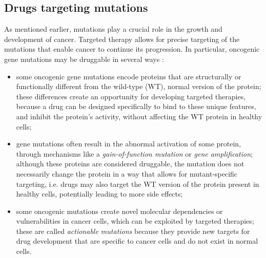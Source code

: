 %
%

\subsection{Drugs targeting mutations}

As mentioned earlier, mutations play a crucial role in the growth and development of cancer. Targeted therapy allows for precise targeting of the mutations that enable cancer to continue its progression. In particular, oncogenic gene mutations may be druggable in several ways \cite{jci}:

\begin{itemize}
    \item some oncogenic gene mutations encode proteins that are structurally or functionally different from the wild-type (WT), normal version of the protein; these differences create an opportunity for developing targeted therapies, because a drug can be designed specifically to bind to these unique features, and inhibit the protein's activity, without affecting the WT protein in healthy cells;
    \item gene mutations often result in the abnormal activation of some protein, through mechanisms like a \textit{gain-of-function mutation} or \textit{gene amplification}; although these proteins are considered druggable, the mutation does not necessarily change the protein in a way that allows for mutant-specific targeting, i.e. drugs may also target the WT version of the protein present in healthy cells, potentially leading to more side effects;
    \item some oncogenic mutations create novel molecular dependencies or vulnerabilities in cancer cells, which can be exploited by targeted therapies; these are called \textit{actionable mutations} because they provide new targets for drug development that are specific to cancer cells and do not exist in normal cells.
\end{itemize}

